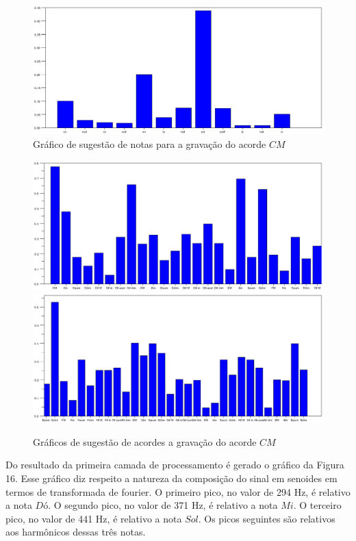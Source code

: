 \begin{figure}[h]
	\centering
		\includegraphics[keepaspectratio=true,scale=0.49]{figuras/CM/notas_cm.eps}
	\caption{Gráfico de sugestão de notas para a gravação do acorde $CM$}
\end{figure}

\begin{figure}[h]
	\centering
		\includegraphics[keepaspectratio=true,scale=0.45]{figuras/CM/acordes_1_cm.eps}
		\includegraphics[keepaspectratio=true,scale=0.45]{figuras/CM/acordes_2_cm.eps}
	\caption{Gráficos de sugestão de acordes a gravação do acorde $CM$}
\end{figure}
\newpage
Do resultado da primeira camada de processamento é gerado o gráfico da Figura 16. Esse gráfico diz respeito a natureza da composição do sinal em senoides em termos de transformada de fourier. O primeiro pico, no valor de 294 Hz, é relativo a nota $Dó$. O segundo pico, no valor de 371 Hz, é relativo a nota $Mi$. O terceiro pico, no valor de 441 Hz, é relativo a nota $Sol$. Os picos seguintes são relativos aos harmônicos dessas três notas.

